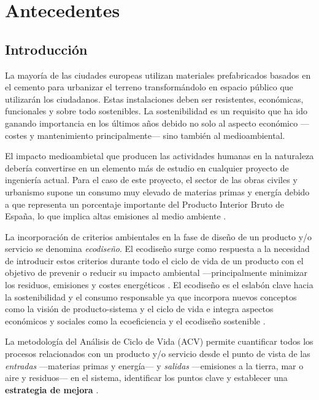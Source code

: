 \chapter{Antecedentes}

\section{Introducción}\label{sec:introantecedentes}
La mayoría de las ciudades europeas utilizan materiales prefabricados basados en el cemento para urbanizar el terreno transformándolo en espacio público que utilizarán los ciudadanos. Estas instalaciones deben ser resistentes, económicas, funcionales y sobre todo sostenibles. La sostenibilidad es un requisito que ha ido ganando importancia en los últimos años debido no solo al aspecto económico —costes y mantenimiento principalmente— sino también al medioambiental.

El impacto medioambietal que producen las actividades humanas en la naturaleza debería convertirse en un elemento más de estudio en cualquier proyecto de ingeniería actual. Para el caso de este proyecto, el sector de las obras civiles y urbanismo supone un consumo muy elevado de materias primas y energía debido a que representa un porcentaje importante del Producto Interior Bruto de España, lo que implica altas emisiones al medio ambiente \cite{minetur}.

La incorporación de criterios ambientales en la fase de diseño de un producto y/o servicio se denomina \textit{ecodiseño}. El ecodiseño surge como respuesta a la necesidad de introducir estos criterios durante todo el ciclo de vida de un producto con el objetivo de prevenir o reducir su impacto ambiental —principalmente minimizar los residuos, emisiones y costes energéticos \cite{iso14006}. El ecodiseño es el eslabón clave hacia la sostenibilidad y el consumo responsable ya que incorpora nuevos conceptos como la visión de producto-sistema y el ciclo de vida e integra aspectos económicos y sociales como la ecoeficiencia y el ecodiseño sostenible \cite{ihobeeco}.

La metodología del Análisis de Ciclo de Vida (ACV) permite cuantificar todos los procesos relacionados con un producto y/o servicio desde el punto de vista de las \textit{entradas} —materias primas y energía— y \textit{salidas} —emisiones a la tierra, mar o aire y residuos— en el sistema, identificar los puntos clave y establecer una \textbf{estrategia de mejora} \cite{iso14040}.

